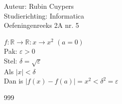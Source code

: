 \documentclass[a4paper]{article}
\newcommand{\R}{\mathbb{R}}
\begin{document}
  
\noindent \large Auteur: Rubin Cuypers \\
\noindent \large Studierichting: Informatica\\
\noindent \large Oefeningenreeks 2A nr. 5\\

\medskip

\normalsize

$f:\R\rightarrow\R:x\rightarrow x^2$ $ (a=0)$\\

Pak: $\varepsilon>0$\\

Stel: $\delta = \sqrt{\varepsilon}$\\

Als $|x|<\delta$\\

Dan is $|f(x)-f(a)|=x^2<\delta^2 = \varepsilon$\\

\begin{thebibliography}{999}
\end{thebibliography}
\end{document}
